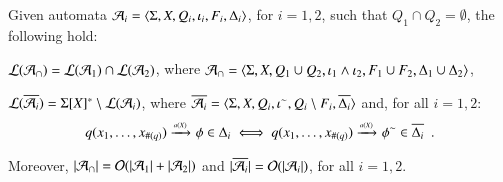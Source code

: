 \documentclass{llncs}
\begin{document}
\begin{theorem}\label{thm:closure}
  Given automata $\mathcal{A}_i = \langle \Sigma,X,Q_i,\iota_i,F_i,\Delta_i \rangle$,
  for $i=1,2$, such that $Q_1 \cap Q_2 = \emptyset$, the following hold: 
  \begin{compactitem}
    \item\label{it1:closure} ${\mathcal L}({\mathcal{A}_\cap}) = {\mathcal L}({\mathcal{A}_1}) \cap {\mathcal L}({\mathcal{A}_2})$, where
      $\mathcal{A}_\cap = \langle \Sigma,X,Q_1 \cup Q_2, \iota_1 \wedge \iota_2,
      F_1 \cup F_2, \Delta_1 \cup \Delta_2 \rangle$, 
    \item\label{it2:closure} ${\mathcal L}({\overline{\mathcal{A}_i}}) = \Sigma[X]^* \setminus
      {\mathcal L}({\mathcal{A}_i})$, where $\overline{\mathcal{A}_i} =
      \langle \Sigma,X,Q_i,{\iota}^{\sim},Q_i\setminus
        F_i,\overline{\Delta_i} \rangle$ and, for all
      $i=1,2$: \[q(x_1,\ldots,x_{\#(q)}) \xrightarrow{{\scriptscriptstyle a(X)}}_{{\scriptstyle }} \phi \in
      \Delta_i \iff q(x_1,\ldots,x_{\#(q)}) \xrightarrow{{\scriptscriptstyle a(X)}}_{{\scriptstyle }} {\phi}^{\sim}
      \in \overline{\Delta_i} \enspace.\]
  \end{compactitem}
  Moreover, ${|{\mathcal{A}_\cap}|} = \mathcal{O}({{|{\mathcal{A}_1}|}+{|{\mathcal{A}_2}|}})$ and
  ${|{\overline{\mathcal{A}_i}}|} = \mathcal{O}({{|{\mathcal{A}_i}|}})$, for all $i=1,2$.
\end{theorem}
\proof{\qed}

 

\end{document}
